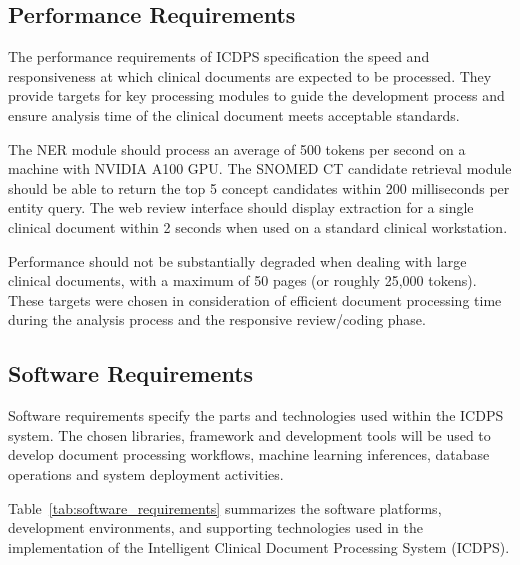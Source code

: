 \subsection{Performance Requirements}

The performance requirements of ICDPS specification the speed and responsiveness at which clinical documents are expected to be processed. They provide targets for key processing modules to guide the development process and ensure analysis time of the clinical document meets acceptable standards.

The NER module should process an average of 500 tokens per second on a machine with NVIDIA A100 GPU. The SNOMED CT candidate retrieval module should be able to return the top 5 concept candidates within 200 milliseconds per entity query. The web review interface should display extraction for a single clinical document within 2 seconds when used on a standard clinical workstation.

Performance should not be substantially degraded when dealing with large clinical documents, with a maximum of 50 pages (or roughly 25,000 tokens). These targets were chosen in consideration of efficient document processing time during the analysis process and the responsive review/coding phase.

\subsection{Software Requirements}

Software requirements specify the parts and technologies used within the ICDPS system. The chosen libraries, framework and development tools will be used to develop document processing workflows, machine learning inferences, database operations and system deployment activities.

Table~\ref{tab:software_requirements} summarizes the software platforms, development environments, and supporting technologies used in the implementation of the Intelligent Clinical Document Processing System (ICDPS).

